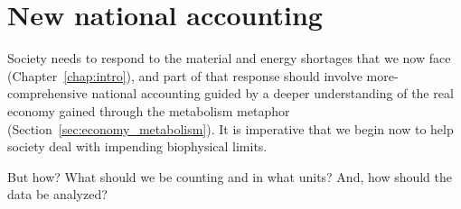 \section{New national accounting}
\label{sec:new_national_accounting}

Society needs to respond 
to the material and energy shortages that
we now face (Chapter~\ref{chap:intro}),
and part of that response
should involve more-comprehensive national accounting 
guided by a deeper understanding of the real economy 
gained through the metabolism metaphor (Section~\ref{sec:economy_metabolism}).
It is imperative that we begin now
to help society deal with impending biophysical limits.

But how? 
What should we be counting and in what units?
And, how should the data be analyzed?




